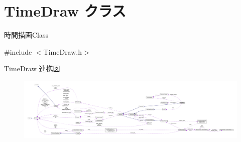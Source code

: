 \hypertarget{class_time_draw}{}\section{Time\+Draw クラス}
\label{class_time_draw}


時間描画\+Class  




{\ttfamily \#include $<$Time\+Draw.\+h$>$}



Time\+Draw 連携図\nopagebreak
\begin{figure}[H]
\begin{center}
\leavevmode
\includegraphics[width=350pt]{class_time_draw__coll__graph}
\end{center}
\end{figure}
